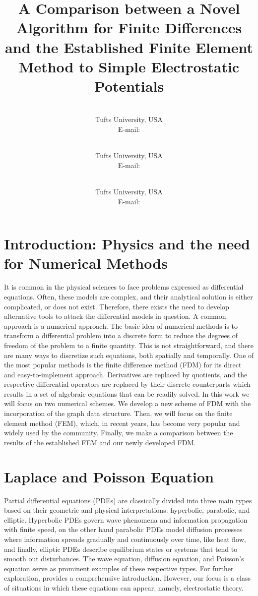 \documentclass{PoS}
\title{A Comparison between a Novel Algorithm for Finite Differences and the Established Finite Element Method to Simple Electrostatic Potentials}
\author{\speaker{Hayden P. Scholz}\\
        Tufts University, USA\\
        E-mail: \email{hayden.scholz@tufts.edu}}
\author{\speaker{J. Emmanuel Flores}\\
        Tufts University, USA\\
        E-mail: \email{jflore10@tufts.edu}}
\author{\speaker{Cullen M. Sullivan}\\
        Tufts University, USA\\
        E-mail: \email{cullen.sullivan@tufts.edu}}
\begin{document}
\section{Introduction: Physics and the need for Numerical Methods}
It is common in the physical sciences to face problems expressed as differential equations. Often, these models are complex, and their analytical solution is either complicated, or does not exist. Therefore, there exists the need to develop alternative tools to attack the differential models in question. A common approach is a numerical approach. The basic idea of numerical methods is to transform a differential problem into a discrete form to reduce the degrees of freedom of the problem to a finite quantity. This is not straightforward, and there are many ways to discretize such equations, both spatially and temporally. One of the most popular methods is the finite difference method (FDM) for its direct and easy-to-implement approach. Derivatives are replaced by quotients, and the respective differential operators are replaced by their discrete counterparts which results in a set of algebraic equations that can be readily solved. In this work we will focus on two numerical schemes. We develop a new scheme of FDM with the incorporation of the graph data structure. Then, we will focus on the finite element method (FEM), which, in recent years, has become very popular and widely used by the community. Finally, we make a comparison between the results of the established FEM and our newly developed FDM.

\section{Laplace and Poisson Equation}
Partial differential equations (PDEs) are classically divided into three main types based on their geometric and physical interpretations: hyperbolic, parabolic, and elliptic. Hyperbolic PDEs govern wave phenomena and information propagation with finite speed, on the other hand parabolic PDEs model diffusion processes where information spreads gradually and continuously over time, like heat flow, and finally, elliptic PDEs describe equilibrium states or systems that tend to smooth out disturbances. The wave equation, diffusion equation, and Poisson's equation serve as prominent examples of these respective types. For further exploration, \cite{nandakumaran2020partial} provides a comprehensive introduction. However, our focus is a class of situations in which these equations can appear, namely, electrostatic theory.
\end{document}
